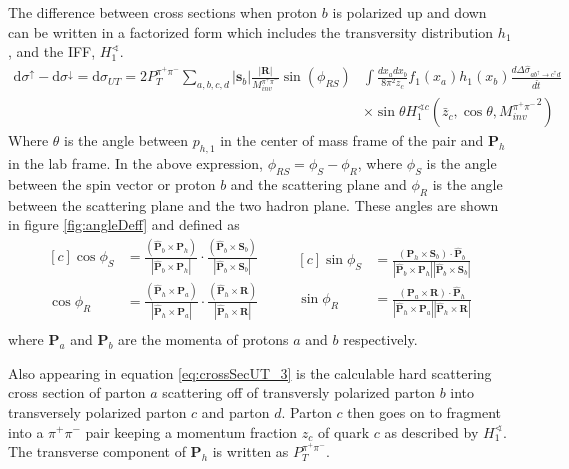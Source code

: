 \documentclass[abstract = on,listof=totoc, bibliography=totoc]{scrreprt}
\newcommand{\phir}{\phi_{R}}
\newcommand{\phis}{\phi_{S}}
\newcommand{\phirs}{\phi_{RS}}
\newcommand{\ptpair}{P_{T}^{\pi^+\pi^-}}
\newcommand{\mpair}{M_{inv}^{\pi^+\pi^-}}
\newcommand{\pip}{\pi^+}
\newcommand{\pim}{\pi^-}
\newcommand{\pair}{$\pip\pim$ }
\begin{document}
The difference between cross sections when proton $b$ is polarized up and down can be written in a factorized form which includes the transversity distribution $h_1$, and the IFF, $H_1^{\sphericalangle}$.
\begin{align}
\label{eq:crossSecUT_3}
\text{d}\sigma^\uparrow - \text{d}\sigma^\downarrow = \text{d}\sigma_{UT} = 2\ptpair \sum_{a,b,c,d} |\boldsymbol{s}_b| \frac{|\boldsymbol{R}|}{\mpair}\sin(\phirs) & \int \frac{dx_a dx_b}{8\pi^2 z_c} f_1(x_a) h_1(x_b) \frac{d\Delta\hat{\sigma}_{a b^\uparrow \rightarrow c^\uparrow d}}{d\hat{t}} \nonumber \\ 
&\times \sin\theta H_1^{\sphericalangle c} \left(\bar{z}_c,\cos\theta, {\mpair}^2\right) 
\end{align}
Where $\theta$ is the angle between $p_{h,1}$ in the center of mass frame of the pair and $\bm{P}_h$ in the lab frame. In the above expression, $\phirs = \phis-\phir$, where $\phis$ is the angle between the spin vector or proton $b$ and the scattering plane and $\phir$ is the angle between the scattering plane and the two hadron plane. These angles are shown in figure \ref{fig:angleDeff} and defined as\cite{bacchettaRadici2}
\begin{equation}
\label{eq:angles}
\begin{aligned}[c]
\cos\phi_S &= \frac{(\bm{\hat{P}}_b \times \bm{P}_h)}{|\bm{\hat{P}}_b \times \bm{P}_h|} \cdot \frac{(\bm{\hat{P}}_b \times \bm{S}_b)}{|\bm{\hat{P}}_b \times \bm{S}_b|} \\
\cos\phi_R &= \frac{(\bm{\hat{P}}_h \times \bm{P}_a)}{|\bm{\hat{P}}_h \times \bm{P}_a|} \cdot \frac{(\bm{\hat{P}}_h \times \bm{R})}{|\bm{\hat{P}}_h \times \bm{R}|} \\
\end{aligned}
\qquad
\begin{aligned}[c]
\sin\phi_S &= \frac{(\bm{P}_h \times \bm{S}_b) \cdot \bm{\hat{P}}_b}{|\bm{\hat{P}}_b \times \bm{P}_h| |\bm{\hat{P}}_b \times \bm{S}_b|} \\
\sin\phi_R &= \frac{(\bm{P}_a \times \bm{R}) \cdot \bm{\hat{P}}_h}{|\bm{\hat{P}}_h \times \bm{P}_a| |\bm{\hat{P}}_h \times \bm{R}|} 
\end{aligned}
\end{equation}
where $\bm{P}_a$ and $\bm{P}_b$ are the momenta of protons $a$ and $b$ respectively.

Also appearing in equation \ref{eq:crossSecUT_3} is the calculable hard scattering cross section of parton $a$ scattering off of transversly polarized parton $b$ into transversely polarized parton $c$ and parton $d$. Parton $c$ then goes on to fragment into a \pair pair keeping a momentum fraction $z_c$ of quark $c$ as described by $H_1^{\sphericalangle}$. The transverse component of $\bm{P}_h$ is written as $\ptpair$. 
\end{document}

